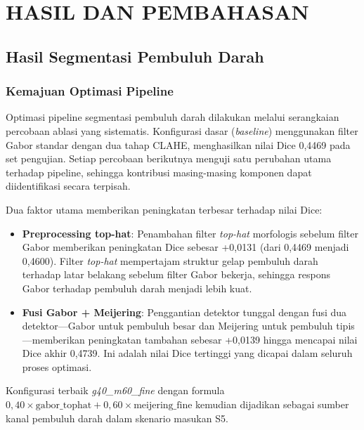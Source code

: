 
\chapter{HASIL DAN PEMBAHASAN}

\section{Hasil Segmentasi Pembuluh Darah}

\subsection{Kemajuan Optimasi Pipeline}

Optimasi pipeline segmentasi pembuluh darah dilakukan melalui serangkaian percobaan ablasi
yang sistematis. Konfigurasi dasar (\textit{baseline}) menggunakan filter Gabor standar dengan
dua tahap CLAHE, menghasilkan nilai Dice 0,4469 pada set pengujian. Setiap percobaan berikutnya
menguji satu perubahan utama terhadap pipeline, sehingga kontribusi masing-masing komponen dapat
diidentifikasi secara terpisah.

Dua faktor utama memberikan peningkatan terbesar terhadap nilai Dice:

\begin{itemize}
    \item \textbf{Preprocessing top-hat}: Penambahan filter \textit{top-hat}
    morfologis sebelum filter Gabor memberikan peningkatan Dice sebesar +0,0131 (dari 0,4469
    menjadi 0,4600). Filter \textit{top-hat} mempertajam struktur gelap pembuluh darah
    terhadap latar belakang sebelum filter Gabor bekerja, sehingga respons Gabor terhadap
    pembuluh darah menjadi lebih kuat.
    \item \textbf{Fusi Gabor + Meijering}: Penggantian detektor tunggal dengan
    fusi dua detektor---Gabor untuk pembuluh besar dan Meijering untuk pembuluh tipis---memberikan
    peningkatan tambahan sebesar +0,0139 hingga mencapai nilai Dice akhir 0,4739. Ini adalah
    nilai Dice tertinggi yang dicapai dalam seluruh proses optimasi.
\end{itemize}

Konfigurasi terbaik \textit{g40\_m60\_fine} dengan formula $0{,}40 \times \text{gabor\_tophat} +
0{,}60 \times \text{meijering\_fine}$ kemudian dijadikan sebagai sumber kanal pembuluh darah
dalam skenario masukan S5.

